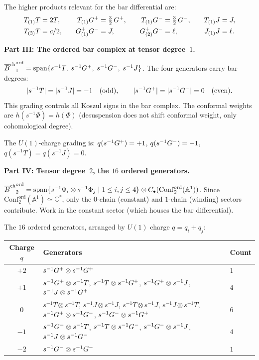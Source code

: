 \begin{computation}
The higher products relevant for the bar differential are:
\begin{equation}\label{eq:n2-higher-products}
\begin{aligned}
T_{(1)}T &= 2T, &\quad
T_{(1)}G^+ &= \tfrac32\,G^+, &\quad
T_{(1)}G^- &= \tfrac32\,G^-, &\quad
T_{(1)}J &= J, \\
T_{(3)}T &= c/2, &\quad
G^+_{(1)}G^- &= J, &\quad
G^+_{(2)}G^- &= \ell, &\quad
J_{(1)}J &= \ell.
\end{aligned}
\end{equation}

\medskip
\noindent\textbf{Part III: The ordered bar complex at tensor
degree~$1$.}

${\overline{B}^{\mathrm{ch}}}^{\mathrm{ord}}_1
= \operatorname{span}\{s^{-1}T,\;s^{-1}G^+,\;
s^{-1}G^-,\;s^{-1}J\}$.
The four generators carry bar degrees:
\[
|s^{-1}T| = |s^{-1}J| = -1 \quad(\text{odd}),\qquad
|s^{-1}G^+| = |s^{-1}G^-| = 0 \quad(\text{even}).
\]
This grading controls all Koszul signs in the bar complex.
The conformal weights are $h(s^{-1}\Phi) = h(\Phi)$ (desuspension
does not shift conformal weight, only cohomological degree).

The $U(1)$-charge grading is:
$q(s^{-1}G^+) = +1$, $q(s^{-1}G^-) = -1$,
$q(s^{-1}T) = q(s^{-1}J) = 0$.

\medskip
\noindent\textbf{Part IV: Tensor degree~$2$, the $16$
ordered generators.}

${\overline{B}^{\mathrm{ch}}}^{\mathrm{ord}}_2
=\operatorname{span}\{s^{-1}\Phi_i\otimes s^{-1}\Phi_j
\mid 1\le i,j\le 4\}
\otimes C_\bullet(\mathrm{Conf}_2^{\mathrm{ord}}(\mathbb A^1))$.
Since $\mathrm{Conf}_2^{\mathrm{ord}}(\mathbb A^1)\simeq
\mathbb C^*$, only the $0$-chain (constant) and $1$-chain
(winding) sectors contribute. Work in the constant sector
(which houses the bar differential).

The $16$ ordered generators, arranged by $U(1)$ charge
$q = q_i + q_j$:
\begin{center}
\renewcommand{\arraystretch}{1.15}
\begin{tabular}{cll}
\textbf{Charge $q$} & \textbf{Generators} & \textbf{Count} \\
\hline
$+2$ & $s^{-1}G^+\otimes s^{-1}G^+$ & $1$ \\
$+1$ & $s^{-1}G^+\otimes s^{-1}T$,\;
$s^{-1}T\otimes s^{-1}G^+$,\;
$s^{-1}G^+\otimes s^{-1}J$,\;
$s^{-1}J\otimes s^{-1}G^+$ & $4$ \\
$0$ & $s^{-1}T\otimes s^{-1}T$,\;
$s^{-1}J\otimes s^{-1}J$,\;
$s^{-1}T\otimes s^{-1}J$,\;
$s^{-1}J\otimes s^{-1}T$,\;
$s^{-1}G^+\otimes s^{-1}G^-$,\;
$s^{-1}G^-\otimes s^{-1}G^+$ & $6$ \\
$-1$ & $s^{-1}G^-\otimes s^{-1}T$,\;
$s^{-1}T\otimes s^{-1}G^-$,\;
$s^{-1}G^-\otimes s^{-1}J$,\;
$s^{-1}J\otimes s^{-1}G^-$ & $4$ \\
$-2$ & $s^{-1}G^-\otimes s^{-1}G^-$ & $1$
\end{tabular}
\end{center}


\end{computation}
